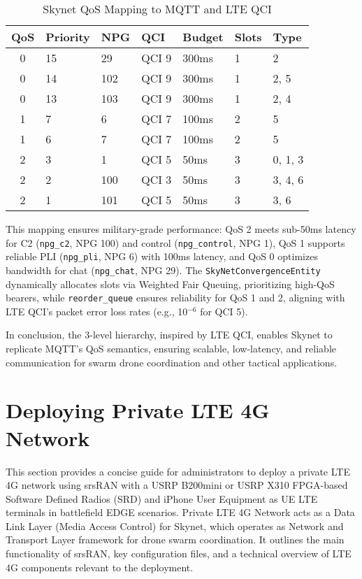 \documentclass{article}
\begin{document}
\begin{table}[ht]
\centering
\caption{Skynet QoS Mapping to MQTT and LTE QCI}
\begin{tabular}{cllllll}
\hline
\textbf{QoS} & \textbf{Priority} & \textbf{NPG} & \textbf{QCI} & \textbf{Budget} & \textbf{Slots} & \textbf{Type} \\
\hline
0 & 15 & 29  & QCI 9 & 300ms & 1 & 2 \\
0 & 14 & 102 & QCI 9 & 300ms & 1 & 2, 5 \\
0 & 13 & 103 & QCI 9 & 300ms & 1 & 2, 4 \\
1 & 7  & 6   & QCI 7 & 100ms & 2 & 5 \\
1 & 6  & 7   & QCI 7 & 100ms & 2 & 5 \\
2 & 3  & 1   & QCI 5 & 50ms  & 3 & 0, 1, 3 \\
2 & 2  & 100 & QCI 3 & 50ms  & 3 & 3, 4, 6 \\
2 & 1  & 101 & QCI 5 & 50ms  & 3 & 3, 6 \\
\hline
\end{tabular}
\end{table}

This mapping ensures military-grade performance: QoS 2 meets sub-50ms latency for C2 (\texttt{npg\_c2},
NPG 100) and control (\texttt{npg\_control}, NPG 1), QoS 1 supports reliable PLI (\texttt{npg\_pli},
NPG 6) with 100ms latency, and QoS 0 optimizes bandwidth for chat (\texttt{npg\_chat}, NPG 29). The
\texttt{SkyNetConvergenceEntity} dynamically allocates slots via Weighted Fair Queuing, prioritizing
high-QoS bearers, while \texttt{reorder\_queue} ensures reliability for QoS 1 and 2, aligning with
LTE QCI’s packet error loss rates (e.g., 10$^{-6}$ for QCI 5).

In conclusion, the 3-level hierarchy, inspired by LTE QCI, enables Skynet to replicate MQTT’s QoS
semantics, ensuring scalable, low-latency, and reliable communication for swarm drone coordination and
other tactical applications.

\newpage
\section{Deploying Private LTE 4G Network}
This section provides a concise guide for administrators to deploy a private LTE 4G network
using srsRAN with a USRP B200mini or USRP X310 FPGA-based Software Defined Radios (SRD)
and iPhone User Equipment as UE LTE terminals in battlefield EDGE scenarios.
Private LTE 4G Network acts as a Data Link Layer (Media Access Control) for Skynet,
which operates as Network and Transport Layer framework for drone swarm coordination.
It outlines the main functionality of srsRAN, key configuration files, and a technical
overview of LTE 4G components relevant to the deployment.
\end{document}
